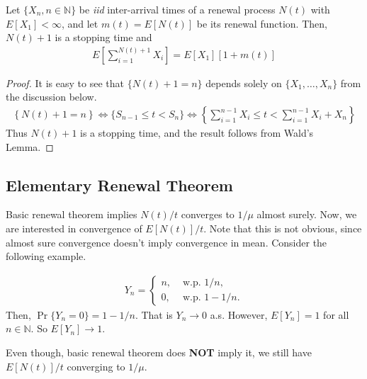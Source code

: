 \documentclass[a4paper,10pt, english]{article}
\begin{document}
\begin{prop} \label{prop:WaldRenewal}
	Let $\{X_n, n \in \mathbb{N}\}$ be \emph{iid} inter-arrival times of a renewal process $N(t)$ with $E[X_1] < \infty$, and let $m(t) = E[N(t)]$ be its renewal function. Then, $N(t)+1$ is a stopping time and 
	\begin{align*}
	E\left[\sum_{i=1}^{N(t)+1}X_i\right] = E[X_1][1+m(t)]
	\end{align*}
\end{prop}
\begin{proof} It is easy to see that $\{N(t)+1=n\}$ depends solely on $\{X_1,\ldots,X_n\}$ from the discussion below.
	\begin{align*}
	\left\{N(t) + 1 = n \right\} \iff \{S_{n-1} \leq t < S_n\} \iff \left\{\sum_{i=1}^{n-1} X_i \leq t < \sum_{i=1}^{n-1} X_i + X_n\right\}
	\end{align*}
	Thus $N(t)+1$ is a stopping time, and the result follows from Wald's Lemma.
\end{proof}

\subsection{Elementary Renewal Theorem}
Basic renewal theorem implies $N(t)/t$ converges to $1/\mu$ almost surely. Now, we are interested in convergence of $E[N(t)]/t$. Note that this is not obvious, since almost sure convergence doesn't imply convergence in mean. Consider the following example.
\begin{exmp}
	\begin{align*}
	Y_n = \begin{cases}
	n, & \mbox{ w.p.  } 1/n,\\
	0, & \mbox{ w.p.  } 1- 1/n.
	\end{cases}
	\end{align*}
	Then, $\Pr\{ Y_n = 0 \} = 1 - 1/n$. %
	That is $Y_n \to 0$ a.s. However, $E[Y_n] = 1$ for all $n \in \mathbb{N}$. So $E[Y_n] \to 1$.
\end{exmp}
Even though, basic renewal theorem does \textbf{NOT} imply it, we still have $E[N(t)]/t$ converging to $1/\mu$.
\end{document}
